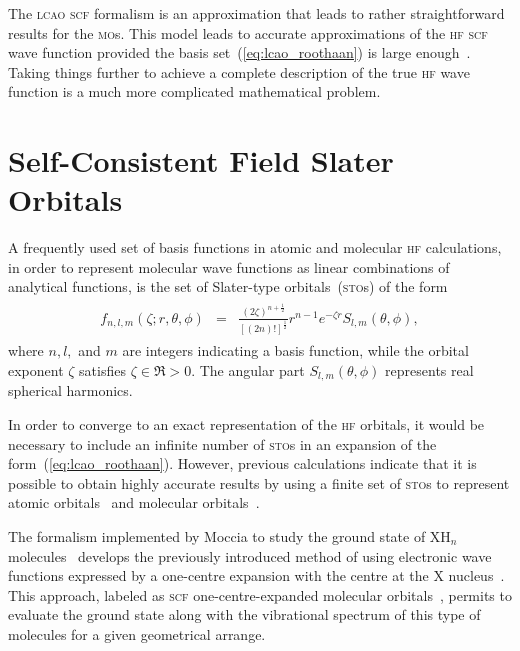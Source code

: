 The \textsc{lcao} \textsc{scf} formalism is an approximation that
leads to rather straightforward results for the \textsc{mo}s. This
model leads to accurate approximations of the \textsc{hf} \textsc{scf}
wave function provided the basis set~(\ref{eq:lcao_roothaan}) is large
enough~\cite{EllisonShullh2o_1955, Moccia_JCP_2164, Moccia_JCP_2176,
  Moccia_1964}. Taking things further to achieve a complete
description of the true \textsc{hf} wave function is a much more
complicated mathematical problem.


\section{Self-Consistent Field Slater Orbitals}
\label{ch:scf_sto}

A frequently used set of basis functions in atomic and molecular
\textsc{hf} calculations, in order to represent molecular wave
functions as linear combinations of analytical functions, is the set
of Slater-type orbitals~(\textsc{sto}s) of the form
%
\begin{eqnarray}
  \begin{split}
    f_{n,l,m}(\zeta;r,\theta,\phi) & = &
    \frac{(2\zeta)^{n + \frac{1}{2}}}{[(2n)!]^{\frac{1}{2}}} r^{n-1} e^{-\zeta r}
    S_{l,m}(\theta,\phi),
  \end{split}
  \label{eq:f_STO}
\end{eqnarray}
%
where $n,l,$ and $m$ are integers indicating a basis function, while
the orbital exponent $\zeta$ satisfies $\zeta \in \Re > 0 $. The
angular part $S_{l,m}(\theta,\phi)$ represents real spherical
harmonics.

In order to converge to an exact representation of the \textsc{hf}
orbitals, it would be necessary to include an infinite number of
\textsc{sto}s in an expansion of the
form~(\ref{eq:lcao_roothaan}). However, previous calculations indicate
that it is possible to obtain highly accurate results by using a
finite set of \textsc{sto}s to represent atomic
orbitals~\cite{Clementi_scfIon_1962,Clementi_STOatoms_1974,Bunge_STOtable_1993}
and molecular
orbitals~\cite{Moccia_JCP_2164,Moccia_JCP_2176,Moccia_1964}.

The formalism implemented by Moccia to study the ground state of
XH$_{n}$ molecules~\cite{Moccia_JCP_2164,Moccia_JCP_2176,Moccia_1964}
develops the previously introduced method of using electronic wave
functions expressed by a one-centre expansion with the centre at the X
nucleus~\cite{Parr_JCP_1960,oneCentre_1961}. This approach, labeled as
\textsc{scf} one-centre-expanded molecular
orbitals~\cite{Moccia_JCP_2164}, permits to evaluate the ground state
along with the vibrational spectrum of this type of molecules for a
given geometrical arrange.

